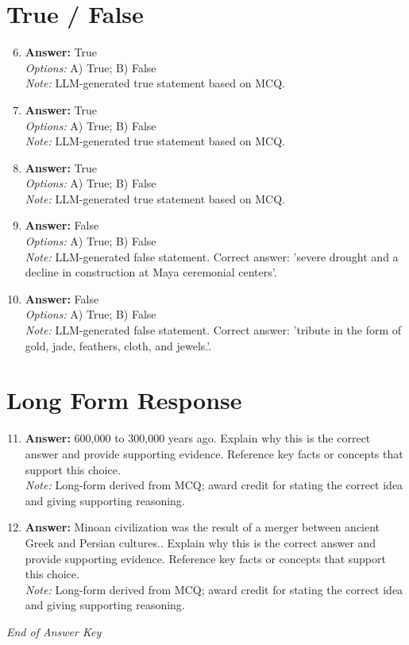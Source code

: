 \documentclass[12pt]{article}
\begin{document}
\section*{True / False}
\begin{enumerate}[label=\arabic*.]
\setcounter{enumi}{5}
\item \textbf{Answer:} True
\\ \textit{Options:} A) True; B) False
\\ \textit{Note:} LLM-generated true statement based on MCQ.
\item \textbf{Answer:} True
\\ \textit{Options:} A) True; B) False
\\ \textit{Note:} LLM-generated true statement based on MCQ.
\item \textbf{Answer:} True
\\ \textit{Options:} A) True; B) False
\\ \textit{Note:} LLM-generated true statement based on MCQ.
\item \textbf{Answer:} False
\\ \textit{Options:} A) True; B) False
\\ \textit{Note:} LLM-generated false statement. Correct answer: 'severe drought and a decline in construction at Maya ceremonial centers'.
\item \textbf{Answer:} False
\\ \textit{Options:} A) True; B) False
\\ \textit{Note:} LLM-generated false statement. Correct answer: 'tribute in the form of gold, jade, feathers, cloth, and jewels.'.
\end{enumerate}

\section*{Long Form Response}
\begin{enumerate}[label=\arabic*.]
\setcounter{enumi}{10}
\item \textbf{Answer:} 600,000 to 300,000 years ago. Explain why this is the correct answer and provide
supporting evidence. Reference key facts or concepts that support this choice.
\\ \textit{Note:} Long-form derived from MCQ; award credit for stating the correct idea and giving supporting reasoning.
\item \textbf{Answer:} Minoan civilization was the result of a merger between ancient Greek and Persian
cultures.. Explain why this is the correct answer and provide supporting evidence.
Reference key facts or concepts that support this choice.
\\ \textit{Note:} Long-form derived from MCQ; award credit for stating the correct idea and giving supporting reasoning.
\end{enumerate}

\vfill
\noindent\textit{End of Answer Key}
\end{document}
